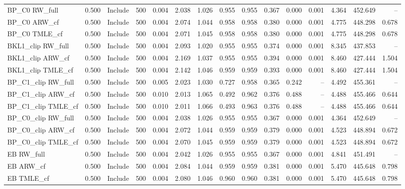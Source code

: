 \begin{tabular}{llllrrrrrrrrrrr}
BP\_C0 RW\_full & 0.500 & Include & 500 & 0.004 & 2.038 & 1.026 & 0.955 & 0.955 & 0.367 & 0.000 & 0.001 & 4.364 & 452.649 & -- \\
BP\_C0 ARW\_cf & 0.500 & Include & 500 & 0.004 & 2.074 & 1.044 & 0.958 & 0.958 & 0.380 & 0.000 & 0.001 & 4.775 & 448.298 & 0.678 \\
BP\_C0 TMLE\_cf & 0.500 & Include & 500 & 0.004 & 2.071 & 1.045 & 0.958 & 0.958 & 0.380 & 0.000 & 0.001 & 4.775 & 448.298 & 0.678 \\
BKL1\_clip RW\_full & 0.500 & Include & 500 & 0.004 & 2.093 & 1.020 & 0.955 & 0.955 & 0.374 & 0.000 & 0.001 & 8.345 & 437.853 & -- \\
BKL1\_clip ARW\_cf & 0.500 & Include & 500 & 0.004 & 2.169 & 1.037 & 0.955 & 0.955 & 0.394 & 0.000 & 0.001 & 8.460 & 427.444 & 1.504 \\
BKL1\_clip TMLE\_cf & 0.500 & Include & 500 & 0.004 & 2.142 & 1.046 & 0.959 & 0.959 & 0.393 & 0.000 & 0.001 & 8.460 & 427.444 & 1.504 \\
BP\_C1\_clip RW\_full & 0.500 & Include & 500 & 0.005 & 2.023 & 1.030 & 0.727 & 0.958 & 0.365 & 0.242 & -- & 4.492 & 455.361 & -- \\
BP\_C1\_clip ARW\_cf & 0.500 & Include & 500 & 0.010 & 2.013 & 1.065 & 0.492 & 0.962 & 0.376 & 0.488 & -- & 4.488 & 455.466 & 0.644 \\
BP\_C1\_clip TMLE\_cf & 0.500 & Include & 500 & 0.010 & 2.011 & 1.066 & 0.493 & 0.963 & 0.376 & 0.488 & -- & 4.488 & 455.466 & 0.644 \\
BP\_C0\_clip RW\_full & 0.500 & Include & 500 & 0.004 & 2.038 & 1.026 & 0.955 & 0.955 & 0.367 & 0.000 & 0.001 & 4.364 & 452.649 & -- \\
BP\_C0\_clip ARW\_cf & 0.500 & Include & 500 & 0.004 & 2.072 & 1.044 & 0.959 & 0.959 & 0.379 & 0.000 & 0.001 & 4.523 & 448.894 & 0.672 \\
BP\_C0\_clip TMLE\_cf & 0.500 & Include & 500 & 0.004 & 2.070 & 1.045 & 0.959 & 0.959 & 0.379 & 0.000 & 0.001 & 4.523 & 448.894 & 0.672 \\
EB RW\_full & 0.500 & Include & 500 & 0.004 & 2.042 & 1.026 & 0.955 & 0.955 & 0.367 & 0.000 & 0.001 & 4.841 & 451.491 & -- \\
EB ARW\_cf & 0.500 & Include & 500 & 0.004 & 2.084 & 1.044 & 0.959 & 0.959 & 0.381 & 0.000 & 0.001 & 5.470 & 445.648 & 0.798 \\
EB TMLE\_cf & 0.500 & Include & 500 & 0.004 & 2.080 & 1.046 & 0.960 & 0.960 & 0.381 & 0.000 & 0.001 & 5.470 & 445.648 & 0.798 \\

\end{tabular}
